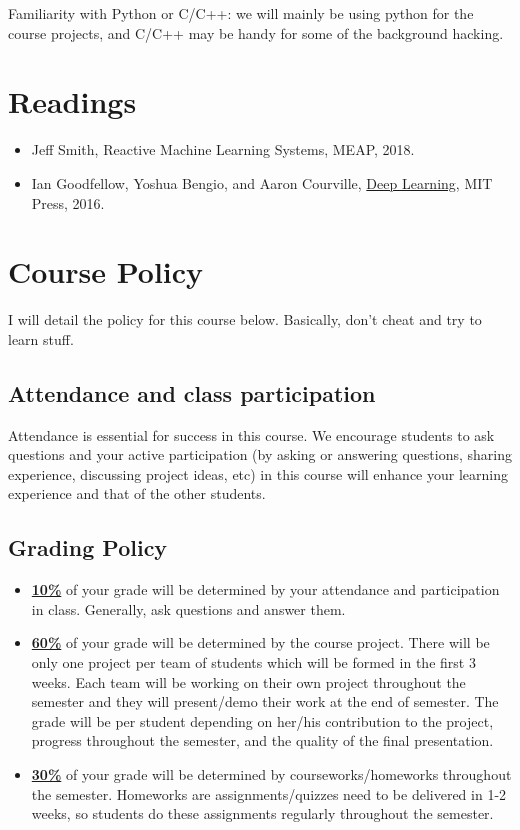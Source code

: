 \documentclass[11pt]{article}
\begin{document}
Familiarity with Python or C/C++: we will mainly be using python for the course projects, and C/C++ may be handy for some of the background hacking.


\section*{Readings}

\begin{itemize}
\item Jeff Smith, Reactive Machine Learning Systems, MEAP, 2018.
\item Ian Goodfellow, Yoshua Bengio, and Aaron Courville, \href{http://www.deeplearningbook.org/}{Deep Learning}, MIT Press, 2016.
\end{itemize} 


\section*{Course Policy}

I will detail the policy for this course below. Basically, don't cheat and try to learn stuff.

\subsection*{Attendance and class participation}
Attendance is essential for success in this course. We encourage students to ask questions and your active participation (by asking or answering questions, sharing experience, discussing project ideas, etc) in this course will enhance your learning experience and that of the other students.

\subsection*{Grading Policy}
\begin{itemize}
  \item \underline{\textbf{10\%}} of your grade will be determined by your attendance and participation in class. Generally, ask questions and answer them.

  \item \underline{\textbf{60\%}} of your grade will be determined by the course project. There will be only one project per team of students which will be formed in the first 3 weeks. Each team will be working on their own project throughout the semester and they will present/demo their work at the end of semester. The grade will be per student depending on her/his contribution to the project, progress throughout the semester, and the quality of the final presentation. 

  \item \underline{\textbf{30\%}} of your grade will be determined by courseworks/homeworks throughout the semester. Homeworks are assignments/quizzes need to be delivered in 1-2 weeks, so students do these assignments regularly throughout the semester.

\end{itemize}
\end{document}
